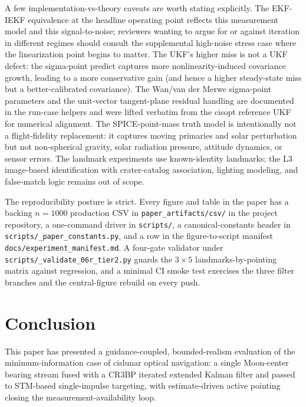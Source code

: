 \documentclass[10pt,twocolumn]{article}
\begin{document}
A few implementation-vs-theory caveats are worth stating explicitly.  The EKF-IEKF equivalence at the headline operating point reflects this measurement model and this signal-to-noise; reviewers wanting to argue for or against iteration in different regimes should consult the supplemental high-noise stress case where the linearization point begins to matter.  The UKF's higher miss is not a UKF defect: the sigma-point predict captures more nonlinearity-induced covariance growth, leading to a more conservative gain (and hence a higher steady-state miss but a better-calibrated covariance).  The Wan/van der Merwe sigma-point parameters and the unit-vector tangent-plane residual handling are documented in the run-case helpers and were lifted verbatim from the cisopt reference UKF for numerical alignment.  The SPICE-point-mass truth model is intentionally not a flight-fidelity replacement: it captures moving primaries and solar perturbation but not non-spherical gravity, solar radiation pressure, attitude dynamics, or sensor errors.  The landmark experiments use known-identity landmarks; the L3 image-based identification with crater-catalog association, lighting modeling, and false-match logic remains out of scope.

The reproducibility posture is strict.  Every figure and table in the paper has a backing $n=1000$ production CSV in \texttt{paper\_artifacts/csv/} in the project repository, a one-command driver in \texttt{scripts/}, a canonical-constants header in \texttt{scripts/\_paper\_constants.py}, and a row in the figure-to-script manifest \texttt{docs/experiment\_manifest.md}.  A four-gate validator under \texttt{scripts/\_validate\_06r\_tier2.py} guards the $3\times 5$ landmarks-by-pointing matrix against regression, and a minimal CI smoke test exercises the three filter branches and the central-figure rebuild on every push.

\section{Conclusion}
\label{sec:conclusion}

This paper has presented a guidance-coupled, bounded-realism evaluation of the minimum-information case of cislunar optical navigation: a single Moon-center bearing stream fused with a CR3BP iterated extended Kalman filter and passed to STM-based single-impulse targeting, with estimate-driven active pointing closing the measurement-availability loop.
\end{document}
